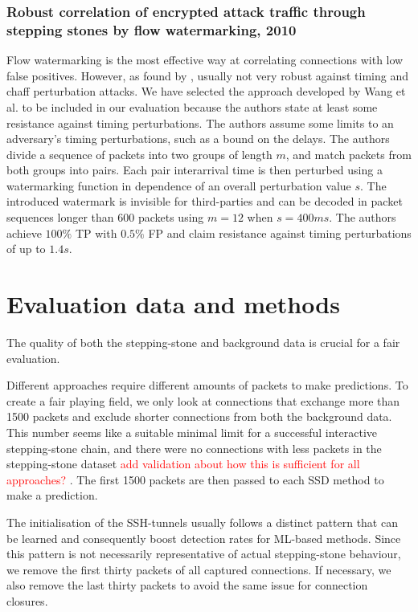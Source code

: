 \documentclass[runningheads]{llncs}\usepackage[]{graphicx}\usepackage[]{color}
\begin{document}
\subsubsection{Robust correlation of encrypted attack traffic through stepping stones by flow watermarking, 2010}
Flow watermarking is the most effective way at correlating connections with low false positives. However, as found by \cite{iacovazzi2016network}, usually not very robust against timing and chaff perturbation attacks. We have selected the approach developed by Wang et al. \cite{wang2010robust} to be included in our evaluation because the authors state at least some resistance against timing perturbations. The authors assume some limits to an adversary's  timing perturbations, such as a bound on the delays. The authors divide a sequence of packets into two groups of length $m$, and match packets from both groups into pairs. Each pair interarrival time is then perturbed using a watermarking function in dependence of an overall perturbation value $s$. 
The introduced watermark is invisible for third-parties and can be decoded in packet sequences longer than 600 packets using $m=12$ when $s=400ms$.  The authors achieve $100\%$ TP with $0.5\%$ FP and claim resistance against timing perturbations of up to $1.4s$.




\section{Evaluation data and methods}\label{Sec:Evaldata}

The quality of both the stepping-stone and background data is crucial for a fair evaluation.

Different approaches require different amounts of packets to make predictions. To create a fair playing field, we only look at connections that exchange more than 1500 packets and exclude shorter connections from both the background data. This number seems like a suitable minimal limit for a successful interactive stepping-stone chain, and there were no connections with less packets in the stepping-stone dataset \textcolor{red}{add validation about how this is sufficient for all approaches?}
. The first 1500 packets are then passed to each SSD method to make a prediction.

The initialisation of the SSH-tunnels usually follows a distinct pattern that can be learned and consequently boost detection rates for ML-based methods. Since this pattern is not necessarily representative of actual stepping-stone behaviour, we remove the first thirty packets of all captured connections. If necessary, we also remove the last thirty packets to avoid the same issue for connection closures. 
\end{document}
